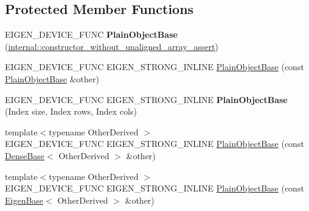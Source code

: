 \subsection*{Protected Member Functions}
\begin{DoxyCompactItemize}
\item 
\mbox{\label{class_eigen_1_1_plain_object_base_a0858f386df98336ff3e4e6dc5ce5fc8d}} 
E\+I\+G\+E\+N\+\_\+\+D\+E\+V\+I\+C\+E\+\_\+\+F\+U\+NC {\bfseries Plain\+Object\+Base} (\mbox{\hyperlink{struct_eigen_1_1internal_1_1constructor__without__unaligned__array__assert}{internal\+::constructor\+\_\+without\+\_\+unaligned\+\_\+array\+\_\+assert}})
\item 
E\+I\+G\+E\+N\+\_\+\+D\+E\+V\+I\+C\+E\+\_\+\+F\+U\+NC E\+I\+G\+E\+N\+\_\+\+S\+T\+R\+O\+N\+G\+\_\+\+I\+N\+L\+I\+NE \mbox{\hyperlink{class_eigen_1_1_plain_object_base_a69656a28768b9b6f8b283e251d3552be}{Plain\+Object\+Base}} (const \mbox{\hyperlink{class_eigen_1_1_plain_object_base}{Plain\+Object\+Base}} \&other)
\item 
\mbox{\label{class_eigen_1_1_plain_object_base_a1fd2d65d4f3b0a5231e84a2093c5f4f6}} 
E\+I\+G\+E\+N\+\_\+\+D\+E\+V\+I\+C\+E\+\_\+\+F\+U\+NC E\+I\+G\+E\+N\+\_\+\+S\+T\+R\+O\+N\+G\+\_\+\+I\+N\+L\+I\+NE {\bfseries Plain\+Object\+Base} (Index size, Index rows, Index cols)
\item 
{\footnotesize template$<$typename Other\+Derived $>$ }\\E\+I\+G\+E\+N\+\_\+\+D\+E\+V\+I\+C\+E\+\_\+\+F\+U\+NC E\+I\+G\+E\+N\+\_\+\+S\+T\+R\+O\+N\+G\+\_\+\+I\+N\+L\+I\+NE \mbox{\hyperlink{class_eigen_1_1_plain_object_base_a82cdb1b9d5c90c2002cb5086c03c29fa}{Plain\+Object\+Base}} (const \mbox{\hyperlink{class_eigen_1_1_dense_base}{Dense\+Base}}$<$ Other\+Derived $>$ \&other)
\item 
{\footnotesize template$<$typename Other\+Derived $>$ }\\E\+I\+G\+E\+N\+\_\+\+D\+E\+V\+I\+C\+E\+\_\+\+F\+U\+NC E\+I\+G\+E\+N\+\_\+\+S\+T\+R\+O\+N\+G\+\_\+\+I\+N\+L\+I\+NE \mbox{\hyperlink{class_eigen_1_1_plain_object_base_a31d65efdbeaf9c7693bf6ae204d788f2}{Plain\+Object\+Base}} (const \mbox{\hyperlink{struct_eigen_1_1_eigen_base}{Eigen\+Base}}$<$ Other\+Derived $>$ \&other)
\item 
\mbox{\label{class_eigen_1_1_plain_object_base_abb80b2ee27de8b5d7ef2c8fb403c0068}} 

\end{DoxyCompactItemize}
